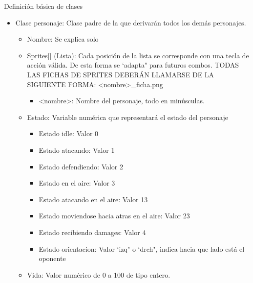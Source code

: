 \documentclass[10pt,a4paper,titlepage]{article}
\begin{document}
Definición básica de clases
\begin{itemize}
	\item Clase personaje: Clase padre de la que derivarán todos los demás personajes.
	\begin{itemize}
		\item Nombre: Se explica solo 
		\item Sprites[] (Lista): Cada posición de la lista se corresponde con una tecla de acción válida. De esta forma se `adapta" para futuros combos.
				TODAS LAS FICHAS DE SPRITES DEBERÁN LLAMARSE DE LA SIGUIENTE FORMA: <nombre>_ficha.png
		\begin{itemize}
			\item <nombre>: Nombre del personaje, todo en minúsculas.
		\end{itemize}
		\item Estado: Variable numérica que representará el estado del personaje
		\begin{itemize}
			\item Estado idle: Valor 0
			\item Estado atacando: Valor 1
			\item Estado defendiendo: Valor 2
			\item Estado en el aire: Valor 3
			\item Estado atacando en el aire: Valor 13
			\item Estado moviendose hacia atras en el aire: Valor 23
			\item Estado recibiendo damages: Valor 4
			\item Estado orientacion: Valor `izq" o `drch", indica hacia que lado está el oponente
		\end{itemize}
		\item Vida: Valor numérico de 0 a 100 de tipo entero.
	\end{itemize}
\end{itemize}
\end{document}
